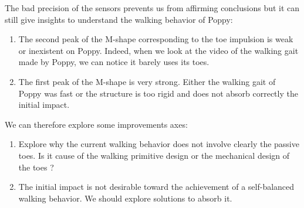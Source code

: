 \begin{figure}[!h]
\centering
    \newline
    \caption{}
    \label{fig:human_GRF}
\end{figure}


The bad precision of the sensors prevents us from affirming conclusions but it can still give insights to understand the walking behavior of Poppy:
\begin{enumerate}
    \item The second peak of the M-shape corresponding to the toe impulsion is weak or inexistent on Poppy. Indeed, when we look at the video of the walking gait made by Poppy, we can notice it barely uses its toes.
    \item The first peak of the M-shape is very strong. Either the walking gait of Poppy was fast or the structure is too rigid and does not absorb correctly the initial impact.
\end{enumerate}

We can therefore explore some improvements axes:
\begin{enumerate}
    \item Explore why the current walking behavior does not involve clearly the passive toes. Is it cause of the walking primitive design or the mechanical design of the toes ?
    \item The initial impact is not desirable toward the achievement of a self-balanced walking behavior. We should explore solutions to absorb it.
\end{enumerate}







